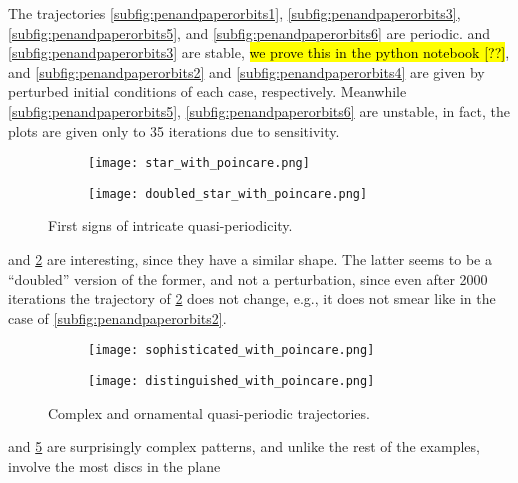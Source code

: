 The trajectories \cref{subfig:penandpaperorbits1}, \ref{subfig:penandpaperorbits3}, \ref{subfig:penandpaperorbits5}, and \ref{subfig:penandpaperorbits6} are periodic.  and \ref{subfig:penandpaperorbits3} are stable, \hl{we prove this in the python notebook [??]}, and \ref{subfig:penandpaperorbits2} and \ref{subfig:penandpaperorbits4} are given by perturbed initial conditions of each case, respectively. Meanwhile \ref{subfig:penandpaperorbits5}, \ref{subfig:penandpaperorbits6} are unstable, in fact, the plots are given only to 35 iterations due to sensitivity.

\begin{figure}[!th]
\centering
\begin{subfigure}{0.49\textwidth}
\texttt{[image: star\_with\_poincare.png]}
\caption{}
\label{subfig:star1}
\end{subfigure}
%
\begin{subfigure}{0.49\textwidth}
\texttt{[image: doubled\_star\_with\_poincare.png]}
\caption{}
\label{subfig:star2}
\end{subfigure}
\caption{First signs of intricate quasi-periodicity.}
\label{fig:stars}
\end{figure}

 and \ref{subfig:star2} are interesting, since they have a similar shape. The latter seems to be a ``doubled'' version of the former, and not a perturbation, since even after 2000 iterations the trajectory of \ref{subfig:star2} does not change, e.g., it does not smear like in the case of \ref{subfig:penandpaperorbits2}.

\begin{figure}[!th]
\centering
\begin{subfigure}{0.49\textwidth}
\texttt{[image: sophisticated\_with\_poincare.png]}
\caption{}
\label{subfig:ornamet1}
\end{subfigure}
%
\begin{subfigure}{0.49\textwidth}
\texttt{[image: distinguished\_with\_poincare.png]}
\caption{}
\label{subfig:ornament2}
\end{subfigure}
\caption{Complex and ornamental quasi-periodic trajectories.}
\label{fig:ornaments}
\end{figure}

\newpage

 and \ref{subfig:ornament2} are surprisingly complex patterns, and unlike the rest of the examples, involve the most discs in the plane

